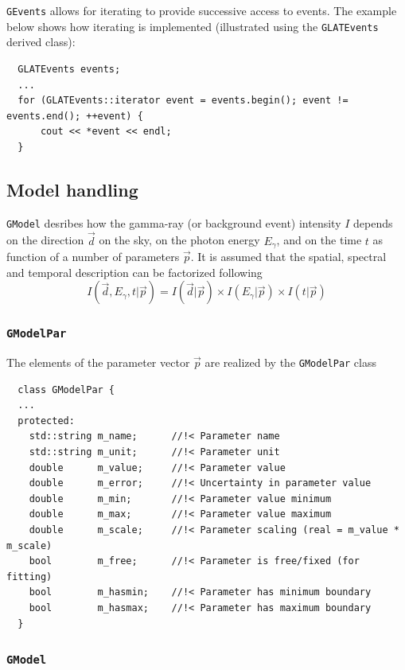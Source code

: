 \documentclass{article}[12pt,a4]
\begin{document}
{\tt GEvents} allows for iterating to provide successive access to events.
The example below shows how iterating is implemented (illustrated using
the {\tt GLATEvents} derived class):
\begin{verbatim}
  GLATEvents events;
  ...
  for (GLATEvents::iterator event = events.begin(); event != events.end(); ++event) {
      cout << *event << endl;
  }
\end{verbatim}


\subsection{Model handling}

{\tt GModel} desribes how the gamma-ray (or background event) intensity $I$ depends on 
the direction $\vec{d}$ on the sky, on the photon energy $E_{\gamma}$, and on the time 
$t$ as function of a number of parameters $\vec{p}$.
It is assumed that the spatial, spectral and temporal description can be factorized following
\begin{equation}
I(\vec{d},E_{\gamma},t | \vec{p}) = I(\vec{d} | \vec{p}) \times I(E_{\gamma} | \vec{p}) 
\times I(t | \vec{p}) 
\end{equation}


\subsubsection{{\tt GModelPar}}

The elements of the parameter vector $\vec{p}$ are realized by the {\tt GModelPar} class
\begin{verbatim}
  class GModelPar {
  ...
  protected:
    std::string m_name;      //!< Parameter name
    std::string m_unit;      //!< Parameter unit
    double      m_value;     //!< Parameter value
    double      m_error;     //!< Uncertainty in parameter value
    double      m_min;       //!< Parameter value minimum
    double      m_max;       //!< Parameter value maximum
    double      m_scale;     //!< Parameter scaling (real = m_value * m_scale)
    bool        m_free;      //!< Parameter is free/fixed (for fitting)
    bool        m_hasmin;    //!< Parameter has minimum boundary
    bool        m_hasmax;    //!< Parameter has maximum boundary
  }
\end{verbatim}


\subsubsection{{\tt GModel}}
\end{document}
